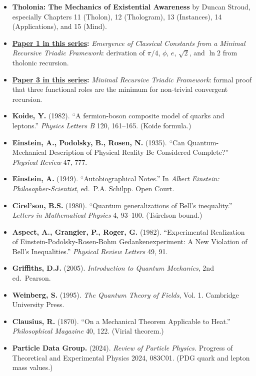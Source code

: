 \documentclass[12pt]{article}
\providecommand{\tightlist}{%
  \setlength{\itemsep}{0pt}\setlength{\parskip}{0pt}}
\begin{document}
\begin{itemize}
\tightlist
\item
  \textbf{Tholonia: The Mechanics of Existential Awareness} by Duncan
  Stroud, especially Chapters 11 (Tholon), 12 (Thologram), 13
  (Instances), 14 (Applications), and 15 (Mind).
\item
  \textbf{\href{https://github.com/baardev/truevalue/blob/main/docnav/Research/papers/1_recursive-tholonic-five-constants/1_recursive-tholonic-five-constants.pdf}{Paper
  1 in this series}:} \emph{Emergence of Classical Constants from a
  Minimal Recursive Triadic Framework}: derivation of \(\pi/4\),
  \(\phi\), \(e\), \(\sqrt{2}\), and \(\ln 2\) from tholonic recursion.
\item
  \textbf{\href{https://github.com/baardev/truevalue/blob/main/docnav/Research/papers/3_minimal-recursive-triadic-framework/3_minimal-recursive-triadic-framework.pdf}{Paper
  3 in this series}:} \emph{Minimal Recursive Triadic Framework}: formal
  proof that three functional roles are the minimum for non-trivial
  convergent recursion.
\item
  \textbf{Koide, Y.} (1982). ``A fermion-boson composite model of quarks
  and leptons.'' \emph{Physics Letters B} 120, 161--165. (Koide
  formula.)
\item
  \textbf{Einstein, A., Podolsky, B., Rosen, N.} (1935). ``Can
  Quantum-Mechanical Description of Physical Reality Be Considered
  Complete?'' \emph{Physical Review} 47, 777.
\item
  \textbf{Einstein, A.} (1949). ``Autobiographical Notes.'' In
  \emph{Albert Einstein: Philosopher-Scientist}, ed.~P.A. Schilpp. Open
  Court.
\item
  \textbf{Cirel'son, B.S.} (1980). ``Quantum generalizations of Bell's
  inequality.'' \emph{Letters in Mathematical Physics} 4, 93--100.
  (Tsirelson bound.)
\item
  \textbf{Aspect, A., Grangier, P., Roger, G.} (1982). ``Experimental
  Realization of Einstein-Podolsky-Rosen-Bohm Gedankenexperiment: A New
  Violation of Bell's Inequalities.'' \emph{Physical Review Letters} 49,
  91.
\item
  \textbf{Griffiths, D.J.} (2005). \emph{Introduction to Quantum
  Mechanics}, 2nd ed.~Pearson.
\item
  \textbf{Weinberg, S.} (1995). \emph{The Quantum Theory of Fields},
  Vol. 1. Cambridge University Press.
\item
  \textbf{Clausius, R.} (1870). ``On a Mechanical Theorem Applicable to
  Heat.'' \emph{Philosophical Magazine} 40, 122. (Virial theorem.)
\item
  \textbf{Particle Data Group.} (2024). \emph{Review of Particle
  Physics.} Progress of Theoretical and Experimental Physics 2024,
  083C01. (PDG quark and lepton mass values.)
\end{itemize}
\end{document}
